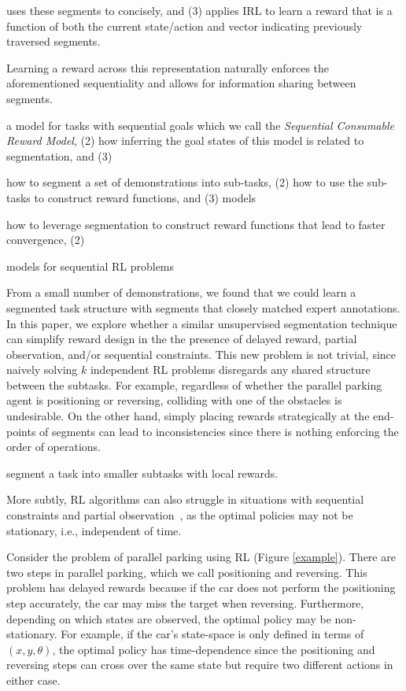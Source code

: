 
\iffalse
uses these segments to concisely, and (3) applies IRL to learn a reward that is a function of both the current state/action and vector indicating previously traversed segments.  

Learning a reward across this representation naturally enforces the aforementioned sequentiality and allows for information sharing between segments.




a model for tasks with sequential goals which we call the \emph{Sequential Consumable Reward Model}, (2) how inferring the goal states of this model is related to segmentation, and (3)

how to segment a set of demonstrations into sub-tasks, (2) how to use the sub-tasks to construct reward functions, and (3) models 

how to leverage segmentation to construct reward functions that lead to faster convergence, (2) 

models for sequential RL problems


From a small number of demonstrations, we found that we could learn a segmented task structure with segments that closely matched expert annotations.
In this paper, we explore whether a similar unsupervised segmentation technique can simplify reward design in the the presence of delayed reward, partial observation, and/or sequential constraints.
This new problem is not trivial, since naively solving $k$ independent RL problems disregards any shared structure between the subtasks. 
For example, regardless of whether the parallel parking agent is positioning or reversing, colliding with one of the obstacles is undesirable.
On the other hand, simply placing rewards strategically at the end-points of segments can lead to inconsistencies since there is nothing enforcing the order of operations.


segment a task into smaller subtasks with local rewards.





More subtly, RL algorithms can also struggle in situations with sequential constraints and partial observation~\cite{DBLP:journals/corr/ZhangLMFA15, DBLP:journals/corr/HeessHLS15}, as the optimal policies may not be stationary, i.e., independent of time.

Consider the problem of parallel parking using RL (Figure \ref{example}). 
There are two steps in parallel parking, which we call positioning and reversing.
This problem has delayed rewards because if the car does not perform the positioning step accurately, the car may miss the target when reversing.
Furthermore, depending on which states are observed, the optimal policy may be non-stationary.
For example, if the car's state-space is only defined in terms of $(x,y,\theta)$, the optimal policy has time-dependence since the positioning and reversing steps can cross over the same state but require two different actions in either case.









